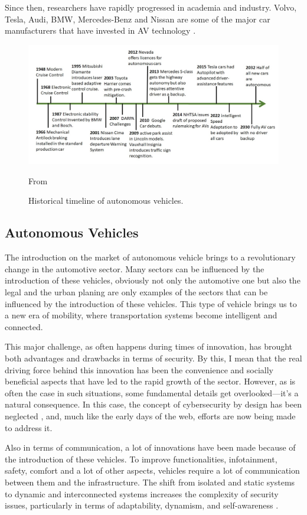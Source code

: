 Since then, researchers have rapidly progressed in academia and industry.
Volvo, Tesla, Audi, BMW,
Mercedes-Benz and Nissan are some of the major car manufacturers that have invested in AV technology \cite{faisal2019understanding}.

\begin{figure}[!htb]
    \centering
    \includegraphics[width=0.7\linewidth]{figures/history}
    \caption{Historical timeline of autonomous vehicles.}
    \footnotesize{From \cite{ahangar2021survey} }
    \label{fig:history}
\end{figure}

\subsection{Autonomous Vehicles}\label{subsec:autonomous-vehicles}

The introduction on the market of autonomous vehicle brings to a revolutionary change in the automotive sector.
Many sectors can be influenced by the introduction of these vehicles, obviously not only the automotive one but also the legal and the urban planing are only examples of the sectors that can be influenced by the introduction of these vehicles.
This type of vehicle brings us to a new era of mobility, where transportation systems become intelligent and connected.

This major challenge, as often happens during times of innovation, has brought both advantages and drawbacks in terms of security.
By this, I mean that the real driving force behind this innovation has been the convenience and socially beneficial aspects that have led to the rapid growth of the sector.
However, as is often the case in such situations, some fundamental details get overlooked—it's a natural consequence.
In this case, the concept of cybersecurity by design has been neglected \cite{sec-by-design}, and, much like the early days of the web, efforts are now being made to address it.

Also in terms of communication, a lot of innovations have been made because of the introduction of these vehicles.
To improve functionalities, infotainment, safety, comfort and a lot of other aspects, vehicles require a lot of communication between them and the infrastructure.
The shift from isolated and static systems to dynamic and interconnected systems increases the complexity of security issues, particularly in terms of adaptability, dynamism, and self-awareness \cite{connected_vehicles_security_2023, bouchouia2023survey} .

